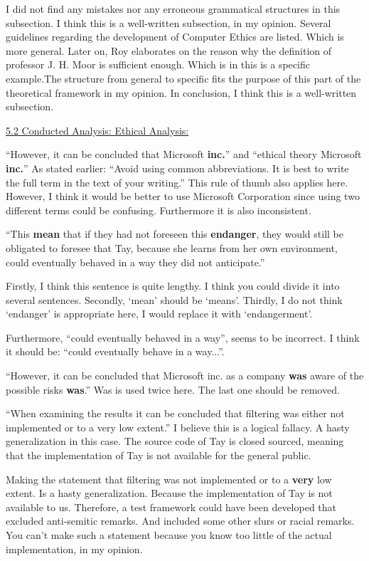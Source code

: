 I did not find any mistakes nor any erroneous grammatical structures in this subsection. I think this is a well-written subsection, in my opinion. Several guidelines regarding the development of Computer Ethics are listed. Which is more general.
Later on, Roy elaborates on the reason why the definition of professor J. H. Moor is sufficient enough. Which is in this is a specific example.The structure from general to specific fits the purpose of this part of the theoretical framework in my opinion. In conclusion, I think this is a well-written subsection.

\underline{5.2 Conducted Analysis: Ethical Analysis:}

“However, it can be concluded that Microsoft \textbf{inc.}” and “ethical theory Microsoft \textbf{inc.}” As stated earlier: “Avoid using common abbreviations. It is best to write the full term in the text of your writing.” This rule of thumb also applies here. However, I think it would be better to use Microsoft Corporation since using two different terms could be confusing. Furthermore it is also inconsistent.

“This \textbf{mean} that if they had not foreseen this \textbf{endanger}, they would still be obligated to foresee that Tay, because she learns from her own environment, could eventually behaved in a way they did not anticipate.”

Firstly, I think this sentence is quite lengthy. I think you could divide it into several sentences. Secondly, ‘mean’ should be ‘means’. Thirdly, I do not think ‘endanger’ is appropriate here, I would replace it with ‘endangerment’.

Furthermore, “could eventually behaved in a way”, seems to be incorrect. I think it should be: “could eventually behave in a way...”.

“However, it can be concluded that Microsoft inc. as a company \textbf{was} aware of the possible risks \textbf{was}.” Was is used twice here. The last one should be removed.

“When examining the results it can be concluded that filtering was either not implemented or to a very low extent.” I believe this is a logical fallacy. A hasty generalization in this case. The source code of Tay is closed sourced, meaning that the implementation of Tay is not available for the general public.

Making the statement that filtering was not implemented or to a \textbf{very} low extent. Is a hasty generalization. Because the implementation of Tay is not available to us. Therefore, a test framework could have been developed that excluded anti-semitic remarks. And included some other slurs or racial remarks. You can’t make such a statement because you know too little of the actual implementation, in my opinion.

